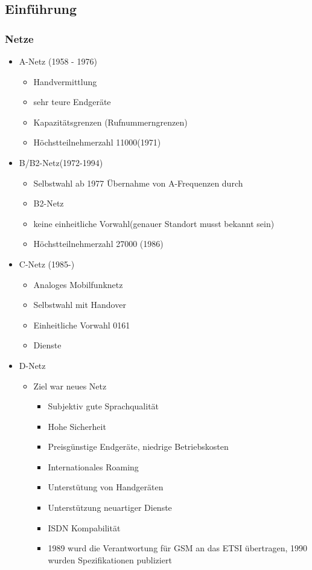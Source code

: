 \subsection{Einführung}
\subsubsection{Netze}
\begin{itemize}
\item A-Netz (1958 - 1976)
\begin{itemize}
\item Handvermittlung
\item sehr teure Endgeräte
\item Kapazitätsgrenzen (Rufnummerngrenzen)
\item Höchstteilnehmerzahl 11000(1971)
\end{itemize}
\item B/B2-Netz(1972-1994)
\begin{itemize}
\item Selbstwahl ab 1977 Übernahme von A-Frequenzen durch
\item B2-Netz
\item keine einheitliche Vorwahl(genauer Standort musst bekannt sein)
\item Höchstteilnehmerzahl 27000 (1986)
\end{itemize}
\item C-Netz (1985-)
\begin{itemize}
\item Analoges Mobilfunknetz
\item Selbstwahl mit Handover
\item Einheitliche Vorwahl 0161
\item Dienste
\end{itemize}
\item D-Netz
\begin{itemize}
\item Ziel war neues Netz
\begin{itemize}
\item Subjektiv gute Sprachqualität
\item Hohe Sicherheit
\item Preisgünstige Endgeräte, niedrige Betriebskosten
\item Internationales Roaming
\item Unterstütung von Handgeräten
\item Unterstützung neuartiger Dienste
\item ISDN Kompabilität
\item 1989 wurd die Verantwortung für GSM an das ETSI übertragen, 1990 wurden Spezifikationen publiziert

\end{itemize}
\end{itemize}
\end{itemize}
